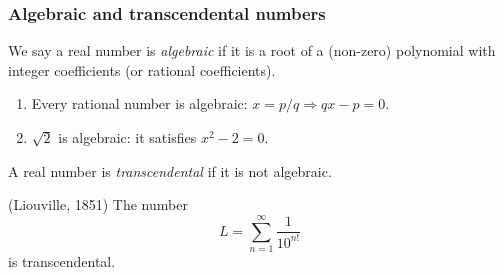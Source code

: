 \documentclass[10pt, a4paper, twoside]{report}
\begin{document}
\subsubsection{Algebraic and transcendental numbers}
We say a real number is \emph{algebraic} if it is a root of a (non-zero) polynomial with integer coefficients (or rational coefficients).
\begin{example} \item[] 
    \begin{enumerate}
        \item Every rational number is algebraic: \(x=p/q\Rightarrow qx-p=0\).
        \item \(\sqrt{2}\) is algebraic: it satisfies \(x^2-2=0\).
    \end{enumerate}
\end{example}
A real number is \emph{transcendental} if it is not algebraic.
\begin{theorem}
    (Liouville, 1851) The number 
    \[L=\sum_{n=1}^{\infty}\frac 1{10^{n!}}\]
    is transcendental.
    \label{thm:trans_liouville}
\end{theorem}
\end{document}
